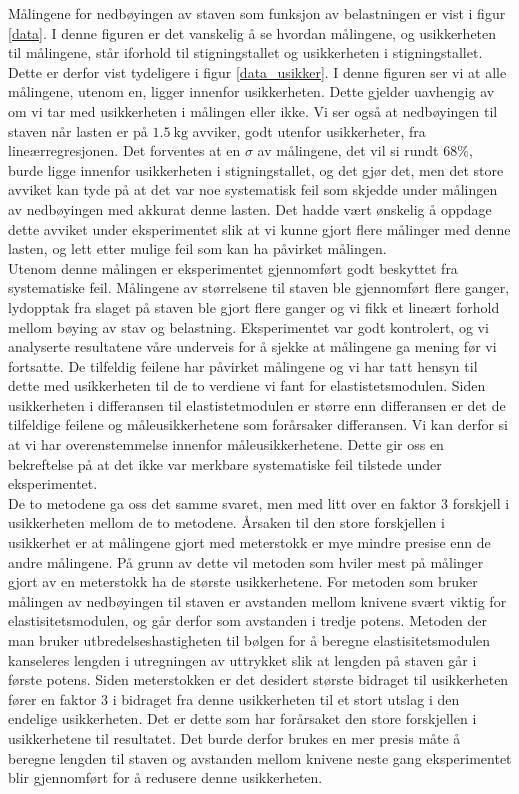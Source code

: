 \documentclass[%
 reprint,
 amsmath,amssymb,
 aps,
 norsk,
 booktabs
]{revtex4-1}
\begin{document}
Målingene for nedbøyingen av staven som funksjon av belastningen er vist i figur \vref{data}. I denne figuren er det vanskelig å se hvordan målingene, og usikkerheten til målingene, står iforhold til stigningstallet og usikkerheten i stigningstallet. Dette er derfor vist tydeligere i figur \vref{data_usikker}. I denne figuren ser vi at alle målingene, utenom en, ligger innenfor usikkerheten. Dette gjelder uavhengig av om vi tar med usikkerheten i målingen eller ikke. Vi ser også at nedbøyingen til staven når lasten er på $\SI{1.5}{\kilo\gram}$ avviker, godt utenfor usikkerheter, fra lineærregresjonen. Det forventes at en $\sigma$ av målingene, det vil si rundt $68\%$, burde ligge innenfor usikkerheten i stigningstallet, og det gjør det, men det store avviket kan tyde på at det var noe systematisk feil som skjedde under målingen av nedbøyingen med akkurat denne lasten. Det hadde vært ønskelig å oppdage dette avviket under eksperimentet slik at vi kunne gjort flere målinger med denne lasten, og lett etter mulige feil som kan ha påvirket målingen.\\
Utenom denne målingen er eksperimentet gjennomført godt beskyttet fra systematiske feil. Målingene av størrelsene til staven ble gjennomført flere ganger, lydopptak fra slaget på staven ble gjort flere ganger og vi fikk et lineært forhold mellom bøying av stav og belastning. Eksperimentet var godt kontrolert, og vi analyserte resultatene våre underveis for å sjekke at målingene ga mening før vi fortsatte. De tilfeldig feilene har påvirket målingene og vi har tatt hensyn til dette med usikkerheten til de to verdiene vi fant for elastistetsmodulen. Siden usikkerheten i differansen til elastistetmodulen er større enn differansen er det de tilfeldige feilene og måleusikkerhetene som forårsaker differansen. Vi kan derfor si at vi har overenstemmelse innenfor måleusikkerhetene. Dette gir oss en bekreftelse på at det ikke var merkbare systematiske feil tilstede under eksperimentet.
\\De to metodene ga oss det samme svaret, men med litt over en faktor $3$ forskjell i usikkerheten mellom de to metodene. Årsaken til den store forskjellen i usikkerhet er at målingene gjort med meterstokk er mye mindre presise enn de andre målingene. På grunn av dette vil metoden som hviler mest på målinger gjort av en meterstokk ha de største usikkerhetene. For metoden som bruker målingen av nedbøyingen til staven er avstanden mellom knivene svært viktig for elastisitetsmodulen, og går derfor som avstanden i tredje potens. Metoden der man bruker utbredelseshastigheten til bølgen for å beregne elastisitetsmodulen kanseleres lengden i utregningen av uttrykket slik at lengden på staven går i første potens. Siden meterstokken er det desidert største bidraget til usikkerheten fører en faktor $3$ i bidraget fra denne usikkerheten til et stort utslag i den endelige usikkerheten. Det er dette som har forårsaket den store forskjellen i usikkerhetene til resultatet. Det burde derfor brukes en mer presis måte å beregne lengden til staven og avstanden mellom knivene neste gang eksperimentet blir gjennomført for å redusere denne usikkerheten.
\end{document}
